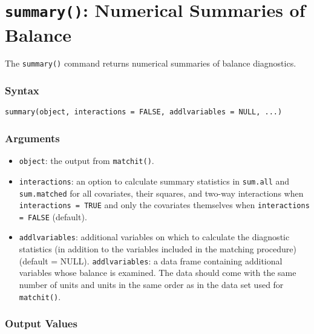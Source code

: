 \section{\texttt{summary()}: Numerical Summaries of Balance}

The \texttt{summary()} command returns numerical summaries of balance
diagnostics.

\subsubsection{Syntax}
\begin{verbatim}
summary(object, interactions = FALSE, addlvariables = NULL, ...)
\end{verbatim}

\subsubsection{Arguments}

\begin{itemize}
\item \texttt{object}: the output from {\tt matchit()}.
\item \texttt{interactions}: an option to calculate summary
  statistics in \texttt{sum.all} and \texttt{sum.matched} for all
  covariates, their squares, and two-way interactions when
  \texttt{interactions = TRUE} and only the covariates themselves when
  \texttt{interactions = FALSE} (default).
\item \texttt{addlvariables}: additional variables on which to
  calculate the diagnostic statistics (in addition to the variables
  included in the matching procedure) (default = NULL).
  \texttt{addlvariables}: a data frame containing additional variables
  whose balance is examined. The data should come with the same number
  of units and units in the same order as in the data set used for
  {\tt matchit()}.
\end{itemize}

\subsubsection{Output Values}

